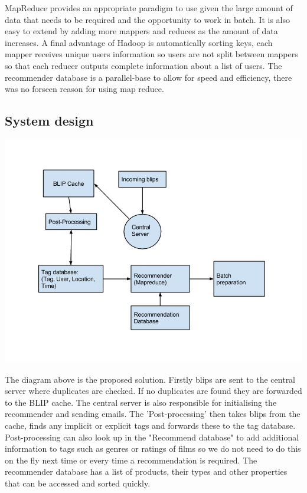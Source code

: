 \documentclass[11pt]{article}
\begin{document}
MapReduce provides an appropriate paradigm to use given the large amount of data that needs to be required and the opportunity to work in batch. It is also easy to extend by adding more mappers and reduces as the amount of data increases. A final advantage of Hadoop is automatically sorting keys, each mapper receives unique users information so users are not split between mappers so that each reducer outputs complete information about a list of users. The recommender database is a parallel-base to allow for speed and efficiency, there was no forseen reason for using map reduce.

\subsection{System design}

\includegraphics[scale=0.4]{database}

The diagram above is the proposed solution. Firstly blips are sent to the central server where duplicates are checked. If no duplicates are found they are forwarded to the BLIP cache. The central server is also responsible for initialising the recommender and sending emails. The 'Post-processing' then takes blips from the cache, finds any implicit or explicit tags and forwards these to the tag database. Post-processing can also look up in the "Recommend database" to add additional information to tags such as genres or ratings of films so we do not need to do this on the fly next time or every time a recommendation is required. The recommender database has a list of products, their types and other properties that can be accessed and sorted quickly.
\end{document}
